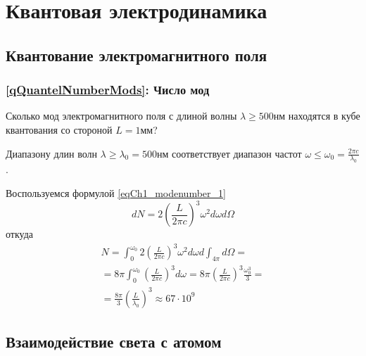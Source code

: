 \chapter{Квантовая электродинамика}

\section{Квантование электромагнитного поля} 

\subsection{\ref{qQuantelNumberMods}: Число мод}
Сколько мод электромагнитного поля с длиной волны
  $\lambda \ge 500 \mbox{нм}$ находятся в кубе квантования со стороной
$L=1 \mbox{мм}$?

Диапазону длин волн $\lambda \ge \lambda_0 = 500 \mbox{нм}$
соответствует диапазон частот
$\omega \le \omega_0 = \frac{2 \pi c}{\lambda_0}$.

Воспользуемся формулой \ref{eqCh1_modenumber_1}
\[
d N = 2 \left(\frac{L}{2 \pi c} \right)^3 \omega^2 d \omega d \Omega
\]
откуда
\begin{eqnarray}
  N = \int_0^{\omega_0} 2 \left(\frac{L}{2 \pi c} \right)^3 \omega^2 d
  \omega d \int_{4 \pi} d \Omega =
  \nonumber \\
  = 8 \pi \int_0^{\omega_0} \left(\frac{L}{2 \pi c} \right)^3 d \omega
  = 8 \pi \left(\frac{L}{2 \pi c}\right)^3 \frac{\omega_0^3}{3} =
  \nonumber \\
  = \frac{8 \pi}{3} \left(\frac{L}{\lambda_0}\right)^3 \approx 67
  \cdot 10^9
  \nonumber
\end{eqnarray}


\section{Взаимодействие света с атомом}
